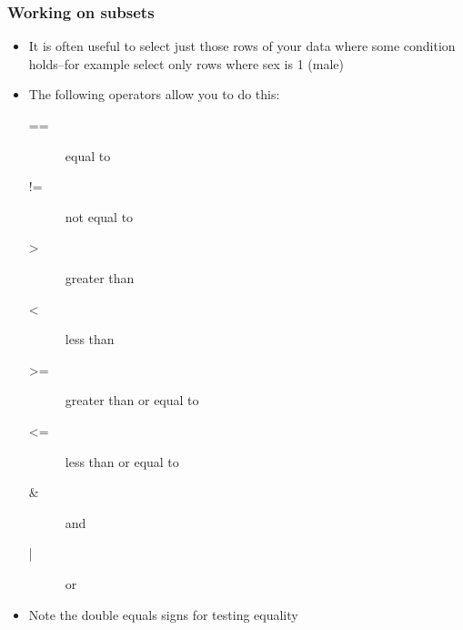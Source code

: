 \documentclass[table]{beamer}
\begin{document}
\begin{frame}
\frametitle{Working on subsets}
\label{sec-4-4}

\begin{itemize}
\item It is often useful to select just those rows of your data where some condition holds--for example select only rows where sex is 1 (male)
\item The following operators allow you to do this:
\begin{description}
\item[==] equal to
\item[!=] not equal to
\item[>] greater than
\item[<] less than
\item[>=] greater than or equal to
\item[<=] less than or equal to
\item[\&] and
\item[|] or
\end{description}
\item Note the double equals signs for testing equality
\end{itemize}
\end{frame}
\end{document}
